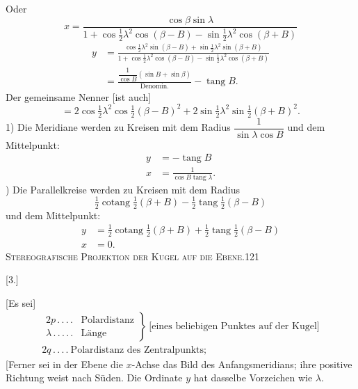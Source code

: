 Oder
\[
x=\frac{\cos\beta\sin\lambda}{1+\cos\frac12\lambda^2\cos(\beta-B)-\sin\frac12\lambda^2\cos(\beta+B)}
\]
\[
\begin{aligned}
y&=\frac{\cos\frac12\lambda^2\sin(\beta-B)+\sin\frac12\lambda^2\sin(\beta+B)}{1+\cos\frac12\lambda^2\cos(\beta-B)-\sin\frac12\lambda^2\cos(\beta+B)}\\[6pt]
&=\frac{\dfrac1{\cos B}(\sin B+\sin\beta)}{\mathrm{Denomin.}}-\operatorname{tang}B.
\end{aligned}
\]
Der gemeinsame Nenner [ist auch]
\[
=2\cos\tfrac12\lambda^2\cos\tfrac12(\beta-B)^2+2\sin\tfrac12\lambda^2\sin\tfrac12(\beta+B)^2.
\]
1) Die Meridiane werden zu Kreisen mit dem Radius $\dfrac1{\sin\lambda\cos B}$ und dem Mittelpunkt:
\[
\begin{aligned}
y&=-\operatorname{tang}B\\
x&=\frac1{\cos B\operatorname{tang}\lambda}.
\end{aligned}
\]
) Die Parallelkreise werden zu Kreisen mit dem Radius
\[
\tfrac12\operatorname{cotang}\tfrac12(\beta+B)-\tfrac12\operatorname{tang}\tfrac12(\beta-B)
\]
und dem Mittelpunkt:
\[
\begin{aligned}
y&=\tfrac12\operatorname{cotang}\tfrac12(\beta+B)+\tfrac12\operatorname{tang}\tfrac12(\beta-B)\\
x&=0.
\end{aligned}
\]
\clearpage
\noindent\mbox{}\hfill{\small\textsc{Stereografische Projektion der Kugel auf die Ebene.}}\hfill121\par\bigskip
\begin{center}[3.]\end{center}
[Es sei]
\[
\begin{gathered}
\left.\begin{array}{ll}
2p\, .\, .\, .\, .&\text{Polardistanz}\\
\lambda\, .\, .\, .\, .\, .&\text{Länge}
\end{array}\right\}\ \text{[eines beliebigen Punktes auf der Kugel]}\\[5pt]
2q\, .\, .\, .\, .\ \text{Polardistanz des Zentralpunkts;}
\end{gathered}
\]
[Ferner sei in der Ebene die $x$-Achse das Bild des Anfangsmeridians; ihre positive Richtung weist nach Süden. Die Ordinate $y$ hat dasselbe Vorzeichen wie $\lambda$.

